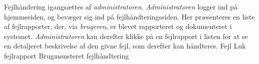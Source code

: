 {Fejlhåndering igangsættes af \textit{administratoren}. \textit{Administratoren} logger ind på hjemmesiden, og bevæger sig ind på fejlhåndteringssiden. Her præsenteres en liste af  fejlrapporter, der, via \textit{brugeren}, er blevet rapporteret og dokumenteret i systemet. \textit{Administratoren} kan derefter klikke på en fejlrapport i listen for at se en detaljeret beskrivelse af den givne fejl, som derefter kan håndteres.}
{Fejl}
{Luk fejlrapport}
{Brugmønsteret fejlhåndtering}
